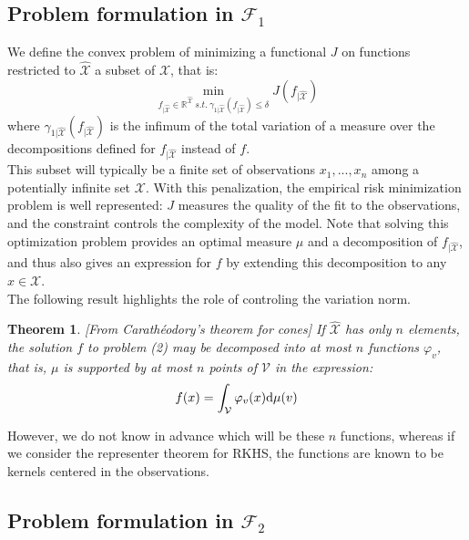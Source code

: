 \documentclass[a4paper, 11pt]{scrartcl}
\newtheorem{theorem}{Theorem}[section]
\begin{document}
\subsection{Problem formulation in $\mathcal{F}_1$}

We define the convex problem of minimizing a functional $J$ on functions restricted to $\mathcal{\hat X}$ a subset of $\mathcal{X}$, that is:
\begin{equation}
\min_{f_{|\mathcal{\hat X}} \in \mathbb{R}^\mathcal{\hat X}~ s.t. ~ \gamma_{1|\mathcal{\hat X}} (f_{|\mathcal{\hat X}}) \leq \delta} J(f_{|\mathcal{\hat X}})
\end{equation}
where $\gamma_{1|\mathcal{\hat X}} (f_{|\mathcal{\hat X}})$ is the infimum of the total variation of a measure over the decompositions defined for $f_{|\mathcal{\hat X}}$ instead of $f$.\\

This subset will typically be a finite set of observations $x_1,...,x_n$ among a potentially infinite set $\mathcal{X}$. With this penalization, the empirical risk minimization problem is well represented: $J$ measures the quality of the fit to the observations, and the constraint controls the complexity of the model. Note that solving this optimization problem provides an optimal measure $\mu$ and a decomposition of $f_{|\mathcal{\hat X}}$, and thus also gives an expression for $f$ by extending this decomposition to any $x\in \mathcal{X}$. \\

The following result highlights the role of controling the variation norm.

\begin{theorem}{\emph{[From Carathéodory's theorem for cones]}} If $\mathcal{\hat X}$ has only $n$ elements, the solution $f$ to problem (2) may be decomposed into at most $n$ functions $\varphi_v$, that is, $\mu$ is supported by at most $n$ points of $\mathcal{V}$ in the expression: $$ f(x) = \int_\mathcal{V} \varphi_v(x) \textnormal{d}\mu(v) $$
\end{theorem}

However, we do not know in advance which will be these $n$ functions, whereas if we consider the representer theorem for RKHS, the functions are known to be kernels centered in the observations.


\subsection{Problem formulation in $\mathcal{F}_2$}
\end{document}

